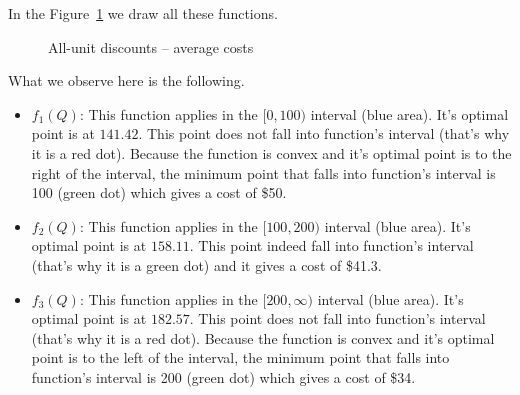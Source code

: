 \begin{solution}
In the Figure~\ref{fig:avgcost_allunit} we draw all these functions.

\begin{figure}[htbp]
\centering
{}
\caption{All-unit discounts -- average costs}
\label{fig:avgcost_allunit}
\end{figure}


What we observe here is the following.
\begin{itemize}
\item $f_1(Q)$: This function applies in the $[0,100)$ interval (blue area). It's optimal point is at $141.42$. This point does not fall into function's interval (that's why it is a red dot). Because the function is convex and it's optimal point is to the right of the interval, the minimum point that falls into function's interval is 100 (green dot) which gives a cost of \$50. 
\item $f_2(Q)$: This function applies in the $[100,200)$ interval (blue area). It's optimal point is at $158.11$. This point indeed fall into function's interval (that's why it is a green dot) and it gives a cost of \$41.3. 
\item $f_3(Q)$: This function applies in the $[200,\infty)$ interval (blue area). It's optimal point is at $182.57$. This point does not fall into function's interval (that's why it is a red dot). Because the function is convex and it's optimal point is to the left of the interval, the minimum point that falls into function's interval is 200 (green dot) which gives a cost of \$34. 
\end{itemize}


\end{solution}
